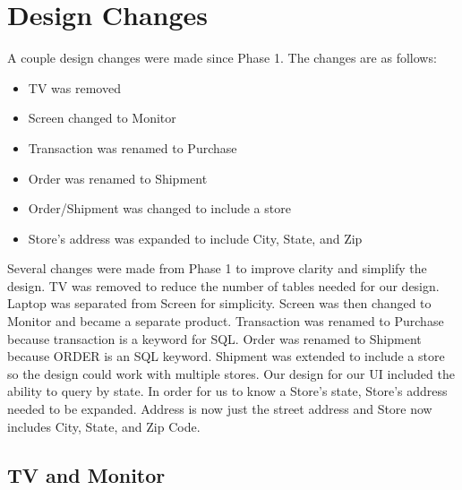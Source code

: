 \documentclass{article}
\begin{document}
  \section{Design Changes}
    A couple design changes were made since Phase 1. The changes are as follows:
    \begin{itemize}
      \item TV was removed
      \item Screen changed to Monitor
      \item Transaction was renamed to Purchase
      \item Order was renamed to Shipment
      \item Order/Shipment was changed to include a store
      \item Store's address was expanded to include City, State, and Zip
    \end{itemize}
    Several changes were made from Phase 1 to improve clarity and simplify the design.  TV was
    removed to reduce the number of tables needed for our design.  Laptop was separated from
    Screen for simplicity. Screen was then changed to Monitor and became a separate product.
    Transaction was renamed to Purchase because transaction is a keyword for SQL.  Order was
    renamed to Shipment because ORDER is an SQL keyword. Shipment was extended to include a
    store so the design could work with multiple stores.  Our design for our UI included the
    ability to query by state. In order for us to know a Store's state, Store's address needed
    to be expanded. Address is now just the street address and Store now includes City, State,
    and Zip Code.
    \subsection{TV and Monitor}


  
\end{document}
